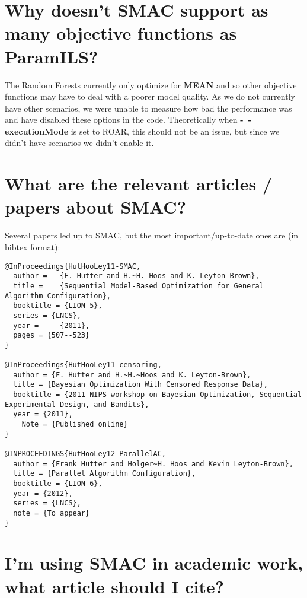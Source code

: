\documentclass[11pt,letterpaper,oneside]{article}
\begin{document}
\section{Why doesn't SMAC support as many objective functions as ParamILS?}
\label{sec:rf-objectives}

	The Random Forests currently only optimize for \textbf{MEAN} and so other objective functions may have to deal with a poorer model quality. As we do not currently have other scenarios, we were unable to measure how bad the performance was and have disabled these options in the code. Theoretically when \textbf{-~$\!$-executionMode} is set to ROAR, this should not be an issue, but since we didn't have scenarios we didn't enable it.

\section{What are the relevant articles / papers about SMAC?}

Several papers led up to SMAC, but the most important/up-to-date ones are (in bibtex format):
\begin{verbatim}
@InProceedings{HutHooLey11-SMAC,
  author =	 {F. Hutter and H.~H. Hoos and K. Leyton-Brown},
  title =	 {Sequential Model-Based Optimization for General Algorithm Configuration},
  booktitle = {LION-5},
  series = {LNCS},
  year =	 {2011},
  pages = {507--523}
}

@InProceedings{HutHooLey11-censoring,
  author = {F. Hutter and H.~H.~Hoos and K. Leyton-Brown},
  title = {Bayesian Optimization With Censored Response Data},
  booktitle = {2011 NIPS workshop on Bayesian Optimization, Sequential Experimental Design, and Bandits},
  year = {2011},
	Note = {Published online}
}

@INPROCEEDINGS{HutHooLey12-ParallelAC,
  author = {Frank Hutter and Holger~H. Hoos and Kevin Leyton-Brown},
  title = {Parallel Algorithm Configuration},
  booktitle = {LION-6},
  year = {2012},
  series = {LNCS},
  note = {To appear}
}
\end{verbatim}



\section{I'm using SMAC in academic work, what article should I cite?}
\end{document}
